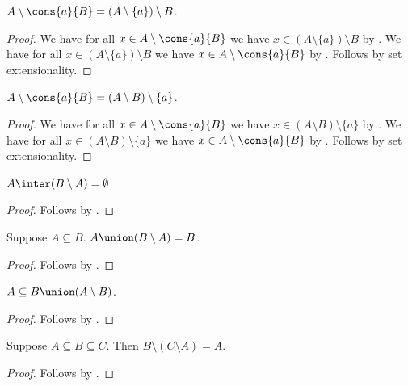 \begin{proposition}\label{setminus_cons}
    $A\setminus \cons{a}{B} = (A\setminus \{a\})\setminus B$.
\end{proposition}
\begin{proof}
    We have for all $x\in A\setminus \cons{a}{B}$ we have
        $x\in (A\setminus \{a\})\setminus B$
        by .
    We have for all $x\in (A\setminus \{a\})\setminus B$ we have
        $x\in A\setminus \cons{a}{B}$
        by .
    Follows by set extensionality.
\end{proof}
\begin{proposition}\label{setminus_cons_flip}
    $A\setminus \cons{a}{B} = (A\setminus B)\setminus \{a\}$.
\end{proposition}
\begin{proof}
    We have for all $x\in A\setminus \cons{a}{B}$ we have
        $x\in (A\setminus B)\setminus \{a\}$
        by .
    We have for all $x\in (A\setminus B)\setminus \{a\}$ we have
        $x\in A\setminus \cons{a}{B}$
        by .
    Follows by set extensionality.
\end{proof}

\begin{proposition}\label{setminus_disjoint}
    $A\inter (B\setminus A) = \emptyset$.
\end{proposition}
\begin{proof}
    Follows by .
\end{proof}

\begin{proposition}\label{setminus_partition}
    Suppose $A\subseteq B$.
    $A\union (B\setminus A) = B$.
\end{proposition}
\begin{proof}
    Follows by .
\end{proof}

\begin{proposition}\label{subseteq_union_setminus}
    $A\subseteq B\union (A\setminus B)$.
\end{proposition}
\begin{proof}
    Follows by .
\end{proof}

\begin{proposition}\label{double_complement}
    Suppose $A\subseteq B\subseteq C$.
    Then $B\setminus (C\setminus A) = A$.
\end{proposition}
\begin{proof}
    Follows by .
\end{proof}

